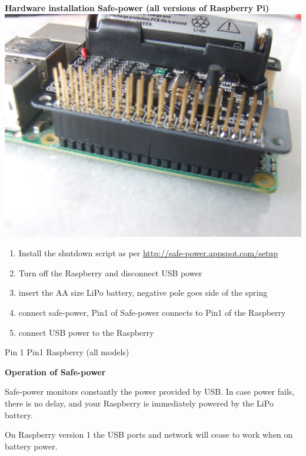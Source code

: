 \documentclass{article}
\begin{document}
 

\textbf{{Hardware installation Safe-power (all versions of Raspberry
Pi)}}
\vspace{5mm} %
\includegraphics[width=\linewidth]{tg1.jpg}

\begin{enumerate}
\def\labelenumi{\arabic{enumi}.}
\item
  Install the shutdown script as per
  \url{http://safe-power.appspot.com/setup}
\item
  Turn off the Raspberry and disconnect USB power
\item
\vspace{5mm} %
  insert the AA size LiPo battery, negative pole goes side of the spring




\item
 connect safe-power, Pin1 of Safe-power connects to Pin1 of the
Raspberry
\item
 connect USB power to the Raspberry
\end{enumerate}
Pin 1 Pin1 Raspberry (all models)





\textbf{Operation of Safe-power}


Safe-power monitors constantly the power provided by USB. In case power
fails, there is no delay, and your Raspberry is immediately powered by
the LiPo battery.

On Raspberry version 1 the USB ports and network will cease to work when
on battery power.
\end{document}
